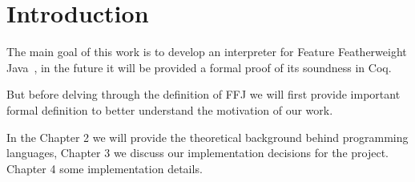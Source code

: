 \chapter{Introduction}

The main goal of this work is to develop an interpreter for Feature
Featherweight Java~\cite{Igarashi99featherweightjava}, in the future it will be
provided a formal proof of its soundness in Coq.

But before delving through the definition of FFJ we will first provide
important formal definition to better understand the motivation of our work.

In the Chapter 2 we will provide the theoretical background behind programming
languages, Chapter 3 we discuss our implementation decisions for the project.
Chapter 4 some implementation details.
